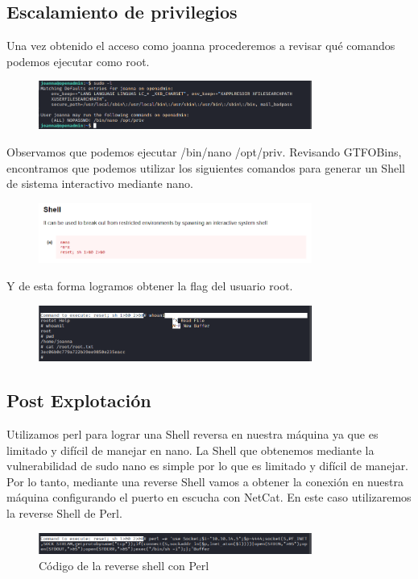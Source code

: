 \documentclass{article}
\begin{document}
\subsection{Escalamiento de privilegios}

Una vez obtenido el acceso como joanna procederemos a revisar qué comandos podemos ejecutar como root.
\begin{figure}[H]
	\center
	\includegraphics[width=0.8\textwidth]{images/openadmin/18-sudol.png}
	\caption{}
\end{figure}

Observamos que podemos ejecutar /bin/nano /opt/priv. Revisando GTFOBins, encontramos que podemos utilizar los siguientes comandos para generar un Shell de sistema interactivo mediante nano.
\begin{figure}[H]
	\center
	\includegraphics[width=0.8\textwidth]{images/openadmin/19-gtfobins.png}
	\caption{}
\end{figure}

Y de esta forma logramos obtener la flag del usuario root.
\begin{figure}[H]
	\center
	\includegraphics[width=0.8\textwidth]{images/openadmin/20-privilegio.png}
	\caption{}
\end{figure}

\subsection{Post Explotación}

Utilizamos perl para lograr una Shell reversa en nuestra máquina ya que es limitado y difícil de manejar en nano.
La Shell que obtenemos mediante la vulnerabilidad de sudo nano es simple por lo que es limitado y difícil de manejar. Por lo tanto, mediante una reverse Shell vamos a obtener la conexión en nuestra máquina configurando el puerto en escucha con NetCat. En este caso utilizaremos la reverse Shell de Perl.
\begin{figure}[H]
	\center
	\includegraphics[width=0.8\textwidth]{images/openadmin/21-reverseshellperl.png}
	\caption{Código de la reverse shell con Perl}
\end{figure}
\end{document}
